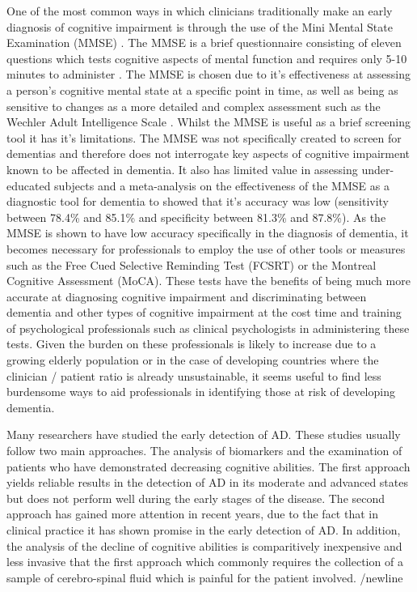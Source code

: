 \documentclass{article}
\begin{document}
One of the most common ways in which clinicians traditionally make an early diagnosis of cognitive impairment is through the use of the Mini Mental State Examination (MMSE) \cite{Folstein1975}. The MMSE is a brief questionnaire consisting of eleven questions which tests cognitive aspects of mental function and requires only 5-10 minutes to administer \cite{Folstein1975}. The MMSE is chosen due to it's effectiveness at assessing a person's cognitive mental state at a specific point in time, as well as being as sensitive to changes as a more detailed and complex assessment such as the Wechler Adult Intelligence Scale \cite{Folstein1975}. Whilst the MMSE is useful as a brief screening tool it has it's limitations. The MMSE was not specifically created to screen for dementias and therefore does not interrogate key aspects of cognitive impairment known to be affected in dementia. It also has limited value in assessing under-educated subjects and a meta-analysis on the effectiveness of the MMSE as a diagnostic tool for dementia to showed that it's accuracy was low (sensitivity between 78.4\% and 85.1\% and specificity between 81.3\% and 87.8\%). As the MMSE is shown to have low accuracy specifically in the diagnosis of dementia, it becomes necessary for professionals to employ the use of other tools or measures such as the Free Cued Selective Reminding Test (FCSRT) or the Montreal Cognitive Assessment (MoCA). These tests have the benefits of being much more accurate at diagnosing cognitive impairment and discriminating between dementia and other types of cognitive impairment at the cost time and training of psychological professionals such as clinical psychologists in administering these tests. Given the burden on these professionals is likely to increase due to a growing elderly population or in the case of developing countries where the clinician / patient ratio is already unsustainable, it seems useful to find less burdensome ways to aid professionals in identifying those at risk of developing dementia. \newline
\par
Many researchers have studied the early detection of AD. These studies usually follow two main approaches. The analysis of biomarkers and the examination of patients who have demonstrated decreasing cognitive abilities. The first approach yields reliable results in the detection of AD in its moderate and advanced states but does not perform well during the early stages of the disease. The second approach has gained more attention in recent years, due to the fact that in clinical practice it has shown promise in the early detection of AD. In addition, the analysis of the decline of cognitive abilities is comparitively inexpensive and less invasive that the first approach which commonly requires the collection of a sample of cerebro-spinal fluid which is painful for the patient involved. /newline
\end{document}
